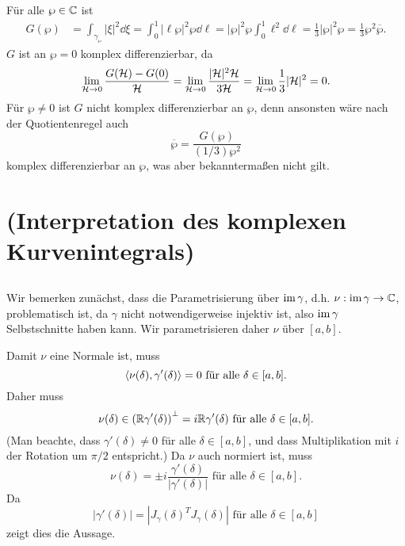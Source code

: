 \documentclass[a4paper,10pt]{article}
\begin{document}
Für alle $\wp \in \mathbb{C}$ ist
\begin{align*}
 G(\wp)
 &= \int_{\gamma_\wp} |\xi|^2 \dd{\xi}
 = \int_0^1 |\ell\wp|^2 \wp \dd{\ell}
 = |\wp|^2 \wp \int_0^1 \ell^2 \dd{\ell}
 = \frac{1}{3} |\wp|^2 \wp
 = \frac{1}{3} \wp^2 \overline{\wp}.
\end{align*}
$G$ ist an $\wp = 0$ komplex differenzierbar, da
\[
 \lim_{\mathcal{H} \to 0} \frac{G(\mathcal{H})-G(0)}{\mathcal{H}}
 = \lim_{\mathcal{H} \to 0} \frac{|\mathcal{H}|^2 \mathcal{H}}{3\mathcal{H}}
 = \lim_{\mathcal{H} \to 0} \frac{1}{3} |\mathcal{H}|^2
 = 0.
\]
Für $\wp \neq 0$ ist $G$ nicht komplex differenzierbar an $\wp$, denn ansonsten wäre nach der Quotientenregel auch
\[
 \overline{\wp} = \frac{G(\wp)}{(1/3)\wp^2}
\]
komplex differenzierbar an $\wp$, was aber bekanntermaßen nicht gilt.





\section{(Interpretation des komplexen Kurvenintegrals)}


\subsection{}
Wir bemerken zunächst, dass die Parametrisierung über $\operatorname{im} \gamma$, d.h. $\nu : \operatorname{im} \gamma \to \mathbb{C}$, problematisch ist, da $\gamma$ nicht notwendigerweise injektiv ist, also $\operatorname{im} \gamma$ Selbstschnitte haben kann. Wir parametrisieren daher $\nu$ über $[a,b]$.

Damit $\nu$ eine Normale ist, muss
\[
 \left\langle \nu(\delta), \gamma'(\delta) \right\rangle = 0 \text{ für alle } \delta \in [a,b].
\]
Daher muss
\[
 \nu(\delta) \in \left( \mathbb{R} \gamma'(\delta) \right)^{\bot} = i \mathbb{R} \gamma'(\delta) \text{ für alle } \delta \in [a,b].
\]
(Man beachte, dass $\gamma'(\delta) \neq 0$ für alle $\delta \in [a,b]$, und dass Multiplikation mit $i$ der Rotation um $\pi/2$ entspricht.) Da $\nu$ auch normiert ist, muss
\[
 \nu(\delta) = \pm i \frac{\gamma'(\delta)}{|\gamma'(\delta)|} \text{ für alle } \delta \in [a,b].
\]
Da
\[
 |\gamma'(\delta)| = \left|J_\gamma(\delta)^T J_\gamma(\delta)\right| \text{ für alle } \delta \in [a,b]
\]
zeigt dies die Aussage.
\end{document}
